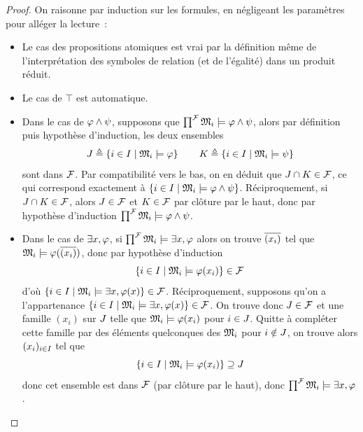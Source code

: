 \begin{proof}
  On raisonne par induction sur les formules, en négligeant les paramètres pour
  alléger la lecture~:
  \begin{itemize}
  \item Le cas des propositions atomiques est vrai par la définition même de
    l'interprétation des symboles de relation (et de l'égalité) dans un
    produit réduit.
  \item Le cas de $\top$ est automatique.
  \item Dans le cas de $\varphi\land\psi$, supposons que
    $\prod^{\mathcal{F}}\mathfrak{M}_i\models \varphi\land \psi$, alors par définition
    puis hypothèse d'induction, les deux ensembles
    \[J \triangleq\left\{ i \in I \;\middle\vert\; \mathfrak{M}_i\models\varphi \right\}\qquad
    K\triangleq\left\{ i \in I \;\middle\vert\; \mathfrak{M}_i\models\psi \right\}\]
    sont dans $\mathcal{F}$. Par compatibilité vers le bas, on en déduit que
    $J\cap K \in \mathcal{F}$, ce qui correspond exactement à
    $\left\{ i \in I \;\middle\vert\; \mathfrak{M}_i\models\varphi\land\psi \right\}$. Réciproquement,
    si $J\cap K \in \mathcal{F}$, alors $J\in \mathcal{F}$ et
    $K\in\mathcal{F}$ par clôture par le haut, donc par hypothèse
    d'induction $\prod^{\mathcal{F}}\mathfrak{M}_i\models\varphi\land\psi$.
  \item Dans le cas de $\exists x, \varphi$, si
    $\prod^{\mathcal{F}}\mathfrak{M}_i\models\exists x, \varphi$ alors on trouve
    $\overline{(x_i)}$ tel que $\mathfrak{M}_i\models\varphi(\overline{(x_i)})$, donc par
    hypothèse d'induction
    \[\left\{ i \in I \;\middle\vert\; \mathfrak{M}_i\models\varphi(x_i) \right\} \in \mathcal{F}\]
    d'où $\left\{ i \in I \;\middle\vert\; \mathfrak{M}_i\models \exists x,\varphi(x) \right\}\in\mathcal{F}$.
    Réciproquement, supposons qu'on a l'appartenance
    $\left\{ i \in I \;\middle\vert\; \mathfrak{M}_i\models\exists x,\varphi(x) \right\}\in\mathcal{F}$.
    On trouve donc $J \in \mathcal{F}$ et une famille $(x_i)$ sur $J$
    telle que $\mathfrak{M}_i\models\varphi(x_i)$ pour $i \in J$. Quitte à
    compléter cette famille par des éléments quelconques des $\mathfrak{M}_i$ pour
    $i\notin J$, on trouve alors $(x_i)_{i \in I}$ tel que
    \[\left\{ i \in I \;\middle\vert\; \mathfrak{M}_i\models\varphi(x_i) \right\}\supseteq J\]
    donc cet ensemble est dans $\mathcal{F}$ (par clôture par le haut), donc
    $\prod^{\mathcal{F}}\mathfrak{M}_i\models\exists x, \varphi$.\qedhere
  \end{itemize}
\end{proof}

